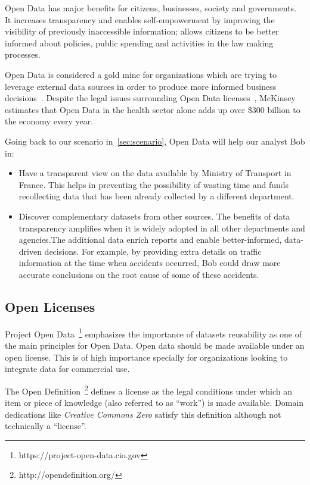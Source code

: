 Open Data has major benefits for citizens, businesses, society and governments. It increases transparency and enables self-empowerment by improving the visibility of previously inaccessible information; allows citizens to be better informed about policies, public spending and activities in the law making processes.

Open Data is considered a gold mine for organizations which are trying to leverage external data sources in order to produce more informed business decisions~\cite{Boyd:Article:11}. Despite the legal issues surrounding Open Data licenses~\cite{Prateek:Misc:13}, McKinsey~\cite{Manyika:Report:13} estimates that Open Data in the health sector alone adds up over \$300 billion to the economy every year.

Going back to our scenario in~\ref{sec:scenario}, Open Data will help our analyst Bob in:

\begin{itemize}
	\item Have a transparent view on the data available by Ministry of Transport in France. This helps in preventing the possibility of wasting time and funds recollecting data that has been already collected by a different department.
	\item Discover complementary datasets from other sources. The benefits of data transparency amplifies when it is widely adopted in all other departments and agencies.The additional data enrich reports and enable better-informed, data-driven decisions. For example, by providing extra details on traffic information at the time when accidents occurred, Bob could draw more accurate conclusions on the root cause of some of these accidents.
\end{itemize}

\subsection{Open Licenses}

Project Open Data~\footnote{https://project-open-data.cio.gov} emphasizes the importance of datasets reusability as one of the main principles for Open Data. Open data should be made available under an open license. This is of high importance specially for organizations looking to integrate data for commercial use.

The Open Definition~\footnote{http://opendefinition.org/} defines a license as the legal conditions under which an item or piece of knowledge (also referred to as ``work'') is made available. Domain dedications like \emph{Creative Commons Zero} satisfy this definition although not technically a ``license''.

